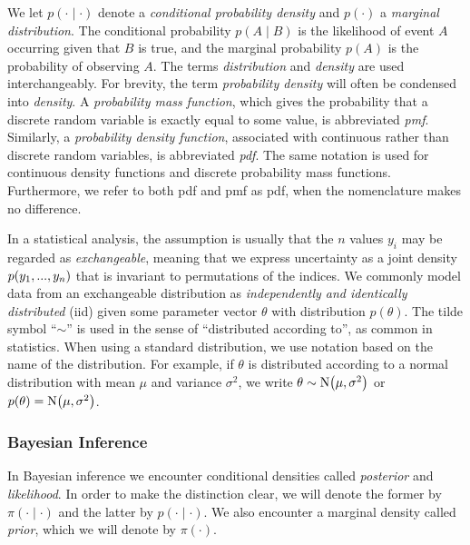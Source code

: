 We let $p(\cdot \mid \cdot)$ denote a \textit{conditional probability density} and $p(\cdot)$ a \textit{marginal distribution}. The conditional probability $p(A \mid B)$ is the likelihood of event $A$ occurring given that $B$ is true, and the marginal probability $p(A)$ is the probability of observing $A$. The terms \textit{distribution} and \textit{density} are used interchangeably. For brevity, the term \textit{probability density} will often be condensed into \textit{density}. A \textit{probability mass function}, which gives the probability that a discrete random variable is exactly equal to some value, is abbreviated \textit{pmf}. Similarly, a \textit{probability density function}, associated with continuous rather than discrete random variables, is abbreviated \textit{pdf}. The same notation is used for continuous density functions and discrete probability mass functions. Furthermore, we refer to both pdf and pmf as pdf, when the nomenclature makes no difference. 

In a statistical analysis, the assumption is usually that the $n$ values $y_i$ may be regarded as \textit{exchangeable}, meaning that we express uncertainty as a joint density $p \qty(y_1, ..., y_n)$ that is invariant to permutations of the indices. We commonly model data from an exchangeable distribution as \textit{independently and identically distributed} (iid) given some parameter vector $\theta$ with distribution $p(\theta)$. The tilde symbol “$\sim$” is used in the sense of “distributed according to”, as common in statistics. When using a standard distribution, we use notation based on the name of the distribution. For example, if $\theta$ is distributed according to a normal distribution with mean $\mu$ and variance $\sigma^2$, we write $\theta \sim \mathrm{N} \qty(\mu, \sigma^2)$ or $p(\theta) = \mathrm{N}\qty(\mu, \sigma^2)$. 



\subsubsection{Bayesian Inference}

In Bayesian inference we encounter conditional densities called \textit{posterior} and \textit{likelihood}. In order to make the distinction clear, we will denote the former by $\pi(\cdot \mid \cdot)$ and the latter by $p(\cdot \mid \cdot)$. We also encounter a marginal density called \textit{prior}, which we will denote by $\pi(\cdot)$.  